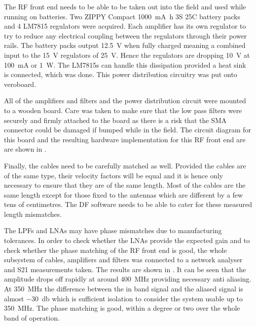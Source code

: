The RF front end needs to be able to be taken out into the field and used while running on batteries.
Two ZIPPY Compact \SI{1000}{\milli\ampere\hour} 3S 25C battery packs and 4 LM7815 regulators were acquired. 
Each amplifier has its own regulator to try to reduce any electrical coupling between the regulators through their power rails.
The battery packs output \SI{12.5}{\volt} when fully charged meaning a combined input to the \SI{15}{\volt} regulators of \SI{25}{\volt}. Hence the regulators are dropping \SI{10}{\volt} at \SI{100}{\milli\ampere} or \SI{1}{\watt}.
The LM7815s can handle this dissipation provided a heat sink is connected, which was done.
This power distribution circuitry was put onto veroboard.

All of the amplifiers and filters and the power distribution circuit were mounted to a wooden board.
Care was taken to make sure that the low pass filters were securely and firmly attached to the board as there is a risk that the SMA connector could be damaged if bumped while in the field.
The circuit diagram for this board and the resulting hardware implementation for this RF front end are are shown in .

Finally, the cables need to be carefully matched as well. Provided the cables are of the same type, their velocity factors will be equal and it is hence only necessary to ensure that they are of the same length. Most of the cables are the same length except for those fixed to the antennas which are different by a few tens of centimetres. The DF software needs to be able to cater for these measured length mismatches. 

The LPFs and LNAs may have phase mismatches due to manufacturing tolerances. In order to check whether the LNAs provide the expected gain and to check whether the phase matching of the RF front end is good, the whole subsystem of cables, amplifiers and filters was connected to a network analyser and S21 measurements taken. The results are shown in . It can be seen that the amplitude drops off rapidly at around \SI{400}{\mega\hertz} providing necessary anti aliasing. At \SI{350}{\mega\hertz} the difference between the in band signal and the aliased signal is almost \SI{-30}{\decibel} which is sufficient isolation to consider the system usable up to \SI{350}{\mega\hertz}. The phase matching is good, within a degree or two over the whole band of operation.

